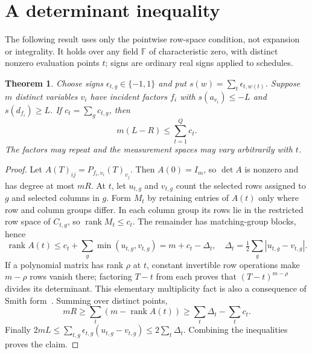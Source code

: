 \documentclass[11pt]{article}
\newtheorem{theorem}{Theorem}
\newcommand{\F}{\mathbb F}
\newcommand{\rank}{\operatorname{rank}}
\begin{document}
\section{A determinant inequality}
The following result uses only the pointwise row-space condition, not expansion or integrality. It holds over any field $\F$ of characteristic zero, with distinct nonzero evaluation points $t$; signs are ordinary real signs applied to schedules.
\begin{theorem}\label{thm:det}
Choose signs $\epsilon_{t,g}\in\{-1,1\}$ and put $s(w)=\sum_t\epsilon_{t,w(t)}$. Suppose $m$ distinct variables $v_i$ have incident factors $f_i$ with $s(a_{v_i})\le-L$ and $s(d_{f_i})\ge L$. If $c_t=\sum_g c_{t,g}$, then
\[m(L-R)\le\sum_{t=1}^Q c_t.\]
The factors may repeat and the measurement spaces may vary arbitrarily with $t$.
\end{theorem}
\begin{proof}
Let $A(T)_{ij}=P_{f_i,v_i}(T)_{v_j}$. Then $A(0)=I_m$, so $\det A$ is nonzero and has degree at most $mR$. At $t$, let $u_{t,g}$ and $v_{t,g}$ count the selected rows assigned to $g$ and selected columns in $g$. Form $M_t$ by retaining entries of $A(t)$ only where row and column groups differ. In each column group its rows lie in the restricted row space of $C_{t,g}$, so $\rank M_t\le c_t$. The remainder has matching-group blocks, hence
\[\rank A(t)\le c_t+\sum_g\min(u_{t,g},v_{t,g})=m+c_t-\Delta_t,\quad \Delta_t=\tfrac12\sum_g|u_{t,g}-v_{t,g}|.\]
If a polynomial matrix has rank $\rho$ at $t$, constant invertible row operations make $m-\rho$ rows vanish there; factoring $T-t$ from each proves that $(T-t)^{m-\rho}$ divides its determinant. This elementary multiplicity fact is also a consequence of Smith form~\cite{matrixpoly}. Summing over distinct points,
\[mR\ge\sum_t(m-\rank A(t))\ge\sum_t\Delta_t-\sum_t c_t.\]
Finally $2mL\le\sum_{t,g}\epsilon_{t,g}(u_{t,g}-v_{t,g})\le2\sum_t\Delta_t$. Combining the inequalities proves the claim.
\end{proof}
\end{document}
